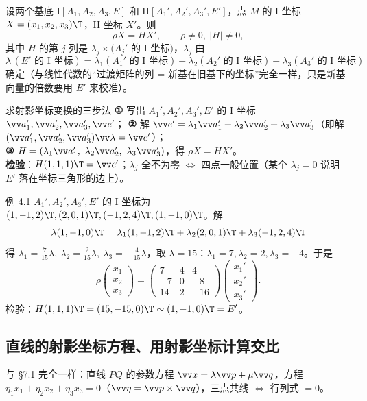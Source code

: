 设两个基底 I$[A_1,A_2,A_3,E]$ 和 II$[A_1',A_2',A_3',E']$，点 $M$ 的 I 坐标 $X=(x_1,x_2,x_3)\T$，II 坐标 $X'$。则
\begin{equation}
\rho X=HX',\qquad \rho\neq0,\ |H|\neq0,
\end{equation}
其中 $H$ 的第 $j$ 列是 $\lambda_j\times(A_j'$ 的 I 坐标$)$，$\lambda_j$ 由
\[
\lambda\,(E'\text{ 的 I 坐标})=\lambda_1(A_1'\text{ 的 I 坐标})+\lambda_2(A_2'\text{ 的 I 坐标})+\lambda_3(A_3'\text{ 的 I 坐标})
\]
确定（与线性代数的“过渡矩阵的列 = 新基在旧基下的坐标”完全一样，只是新基向量的倍数要用 $E'$ 来校准）。

\begin{mtbox}{求射影坐标变换的三步法}
\textbf{①} 写出 $A_1',A_2',A_3',E'$ 的 I 坐标 $\vv a_1',\vv a_2',\vv a_3',\vv e'$；\quad
\textbf{②} 解 $\vv e'=\lambda_1\vv a_1'+\lambda_2\vv a_2'+\lambda_3\vv a_3'$（即解 $(\vv a_1',\vv a_2',\vv a_3')\vv\lambda=\vv e'$）；\\
\textbf{③} $H=(\lambda_1\vv a_1',\ \lambda_2\vv a_2',\ \lambda_3\vv a_3')$，得 $\rho X=HX'$。\\[2pt]
\textbf{检验}：$H(1,1,1)\T=\vv e'$；$\lambda_j$ 全不为零 $\iff$ 四点一般位置（某个 $\lambda_j=0$ 说明 $E'$ 落在坐标三角形的边上）。
\end{mtbox}

\begin{mtbox}{例 4.1}
$A_1',A_2',A_3',E'$ 的 I 坐标为 $(1,-1,2)\T,(2,0,1)\T,(-1,2,4)\T,(1,-1,0)\T$。解
\[
\lambda(1,-1,0)\T=\lambda_1(1,-1,2)\T+\lambda_2(2,0,1)\T+\lambda_3(-1,2,4)\T
\]
得 $\lambda_1=\frac7{15}\lambda,\ \lambda_2=\frac2{15}\lambda,\ \lambda_3=-\frac4{15}\lambda$，取 $\lambda=15$：$\lambda_1=7,\lambda_2=2,\lambda_3=-4$。于是
\[
\rho\begin{pmatrix}x_1\\x_2\\x_3\end{pmatrix}=\begin{pmatrix}7&4&4\\-7&0&-8\\14&2&-16\end{pmatrix}\begin{pmatrix}x_1'\\x_2'\\x_3'\end{pmatrix}.
\]
检验：$H(1,1,1)\T=(15,-15,0)\T\sim(1,-1,0)\T=E'$。\checkmark
\end{mtbox}

\subsection{直线的射影坐标方程、用射影坐标计算交比}
与 \S7.1 完全一样：直线 $PQ$ 的参数方程 $\vv x=\lambda\vv p+\mu\vv q$，方程 $\eta_1x_1+\eta_2x_2+\eta_3x_3=0$（$\vv\eta=\vv p\times\vv q$），三点共线 $\iff$ 行列式 $=0$。

